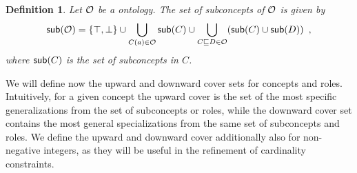 \documentclass[
]{ceurart}
\newtheorem{definition}{Definition}
\begin{document}
\begin{definition}
  Let $\mathcal{O}$ be a \SROIQ ontology. The set of \emph{subconcepts} of $\mathcal{O}$ is given by 
  \begin{align*}
    \mathop{\mathsf{sub}}(\mathcal{O}) = \{\top, \bot\} \cup \bigcup_{C(a) \in \mathcal{O}} \mathop{\mathsf{sub}}(C) \cup \bigcup_{C \sqsubseteq D \in \mathcal{O}} ( \mathop{\mathsf{sub}}(C) \cup \mathop{\mathsf{sub}}(D) ) \enspace,
  \end{align*}
  where $\mathop{\mathsf{sub}}(C)$ is the set of \emph{subconcepts} in $C$.
\end{definition}

We will define now the upward and downward cover sets for concepts and roles. Intuitively, for a given concept the upward cover is the set of the most specific generalizations from the set of subconcepts or roles, while the downward cover set contains the most general specializations from the same set of subconcepts and roles. We define the upward and downward cover additionally also for non-negative integers, as they will be useful in the refinement of cardinality constraints.
\end{document}
